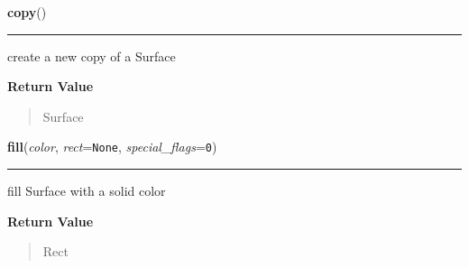     \label{pygame:Surface:copy}

    \vspace{0.5ex}

\hspace{.8\funcindent}\begin{boxedminipage}{\funcwidth}

    \raggedright \textbf{copy}()

    \vspace{-1.5ex}

    \rule{\textwidth}{0.5\fboxrule}
\setlength{\parskip}{2ex}
    create a new copy of a Surface

\setlength{\parskip}{1ex}
      \textbf{Return Value}
    \vspace{-1ex}

      \begin{quote}
      Surface

      \end{quote}

    \end{boxedminipage}

    \label{pygame:Surface:fill}

    \vspace{0.5ex}

\hspace{.8\funcindent}\begin{boxedminipage}{\funcwidth}

    \raggedright \textbf{fill}(\textit{color}, \textit{rect}={\tt None}, \textit{special\_flags}={\tt 0})

    \vspace{-1.5ex}

    \rule{\textwidth}{0.5\fboxrule}
\setlength{\parskip}{2ex}
    fill Surface with a solid color

\setlength{\parskip}{1ex}
      \textbf{Return Value}
    \vspace{-1ex}

      \begin{quote}
      Rect

      \end{quote}

    \end{boxedminipage}

    \label{pygame:Surface:get_abs_offset}

    \vspace{0.5ex}

